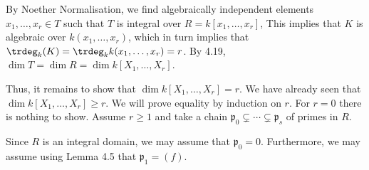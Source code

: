 By Noether Normalisation, we find algebraically independent elements
 $x_1, \ldots, x_r \in T$ such that $T$ is integral over $R = k[x_1, \ldots, x_r]$,
This implies that $K$ is algebraic over $k(x_1, \ldots, x_r)$, which in turn
implies that $\trdeg_k(K) = \trdeg_kk(x_1, \ldots, x_r) = r$.
By 4.19, $\dim T = \dim R = \dim k[X_1, \ldots, X_r]$.

Thus, it remains to show that $\dim k[X_1, \ldots, X_r] = r$. We have already
seen that $\dim k[X_1, \ldots, X_r] \geq r$. We will prove equality by induction
on $r$. For $r = 0$ there is nothing to show. Assume $r\geq 1$ and take
a chain $\mathfrak{p}_0 \subsetneq \cdots\subsetneq \mathfrak{p}_s$ of primes in $R$.

Since $R$ is an integral domain, we may assume that $\mathfrak{p}_0 = 0$. Furthermore,
we may assume using Lemma 4.5 that $\mathfrak{p}_1 = (f)$.
